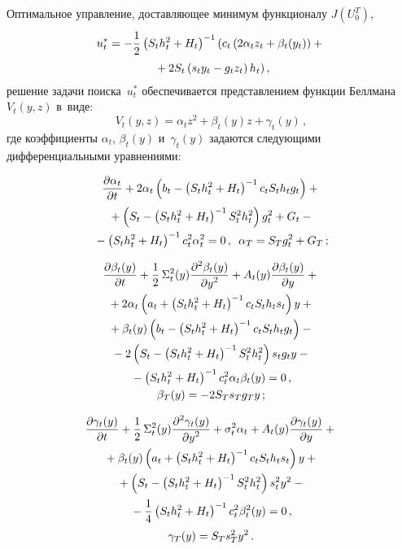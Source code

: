 \begin{multicols}{2}
     Оптимальное управление, до\-став\-ля\-ющее минимум функционалу 
$J\left(U_0^T\right)$, 
\begin{multline*}
u_t^*= -\fr{1}{2} \left( S_th_t^2+ H_t  
\right)^{-1} \left( c_t\left( 2\alpha_t z_t \hm+\beta_t(y_t)\right) +{}\right.\\
\left.{}+ 2S_t\left( s_t 
y_t - g_t z_t\right) h_t\right),
\end{multline*}
решение задачи поиска~$u_t^*$ 
обеспечивается пред\-став\-ле\-ни\-ем функции Беллмана~$V_t(y,z)$ в~виде:
     \begin{equation*}
     V_t(y,z) =\alpha_t z^2+\beta_t(y)z +\gamma_t(y)\,,
\end{equation*}
где коэффициенты $\alpha_t$, $\beta_t(y)$ и~$\gamma_t(y)$ задаются 
сле\-ду\-ющи\-ми дифференциальными уравнениями:

\noindent
\begin{multline}
\displaystyle\frac{\displaystyle \partial \alpha_t\mathstrut}{\displaystyle \partial t\mathstrut} +2\alpha_t\left( b_t-\left(
S_th_t^2+H_t\right)^{-1} c_t S_t 
h_t g_t\right) +{}\\
{}+\left( S_t-\left( S_t h_t^2+H_t\right)^{-1} S_t^2 h_t^2\right) g_t^2 
+G_t-{}\\
{}- \left( S_t h_t^2+H_t\right)^{-1} c_t^2 \alpha_t^2 =0\,,\enskip \alpha_T=  
S_Tg_t^2+G_T\,;
\label{e5-bos}
\end{multline}

\vspace*{-12pt}

\noindent
\begin{multline}
\displaystyle\frac{\displaystyle \partial \beta_t(y)\mathstrut}{\displaystyle \partial 
t\mathstrut}+\displaystyle\frac{\displaystyle 1\mathstrut}{\displaystyle 2\mathstrut}\,\Sigma_t^2(y)\displaystyle\frac{\displaystyle \partial^2\beta_t(y)\mathstrut}{\displaystyle \partial 
y^2\mathstrut}+A_t(y)\displaystyle\frac{\displaystyle \partial \beta_t(y)\mathstrut}{\displaystyle \partial y\mathstrut}+{}\\
{}+ 2\alpha_t\left( a_t+\left( S_th_t^2+H_t\right)^{-1} c_t S_t h_t 
s_t\right)y+{}\\
{}+\beta_t(y)\left(
b_t-\left( S_th_t^2+H_t\right)^{-1}c_t S_t h_t g_t\right)-{}\\
{}-2\left(S_t-\left( S_t h_t^2+H_t\right)^{-1} S_t^2h_t^2\right) s_t g_t y-{}\\
{}-\left( S_t 
h_t^2+H_t\right)^{-1}c_t^2 \alpha_t\beta_t(y)=0\,,\\ 
\beta_T(y)=-2S_T s_Tg_Ty\,;
\label{e6-bos}
\end{multline}

\vspace*{-12pt}

\noindent
\begin{multline}
\displaystyle\frac{\displaystyle \partial \gamma_t(y)\mathstrut}{\displaystyle \partial t\mathstrut} +\displaystyle\frac{\displaystyle 1\mathstrut}{\displaystyle 2\mathstrut}\,\Sigma_t^2(y)\displaystyle\frac{\displaystyle \partial^2 
\gamma_t(y)\mathstrut}{\displaystyle \partial y^2\mathstrut}+\sigma_t^2 \alpha_t +A_t(y) \displaystyle\frac{\displaystyle \partial 
\gamma_t(y)\mathstrut}{\displaystyle \partial y\mathstrut}+{}\\
{}+\beta_t(y)\left( a_t +\left( S_th_t^2+H_t\right)^{-1} c_t S_t h_t 
s_t\right)y+{}\\
{}+\left( S_t-\left( S_t h_t^2+H_t\right)^{-1}S_t^2 h_t^2\right) s_t^2y^2-
{}\\
{}- \displaystyle\frac{\displaystyle 1\mathstrut}{\displaystyle 4\mathstrut}\left( S_t h_t^2+H_t\right)^{-1} c_t^2 \beta_t^2(y)=0\,,\\
\gamma_T(y)=S_T s_T^2 y^2\,.
\label{e7-bos}
\end{multline}


\end{multicols}
